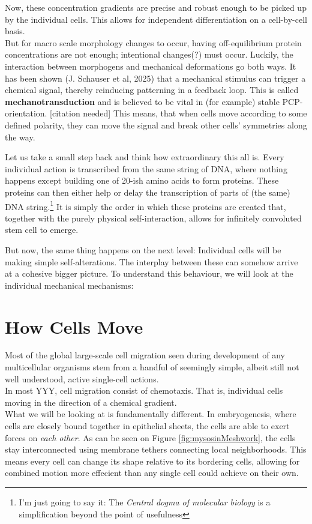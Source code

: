 Now, these concentration gradients are precise and robust enough to be picked up by the individual cells. This allows for independent differentiation on a cell-by-cell basis.\\


But for macro scale morphology changes to occur, having off-equilibrium protein concentrations are not enough; intentional changes(?) must occur. Luckily, the interaction between morphogens and mechanical deformations go both ways. It has been shown (J. Schauser et al, 2025) that a mechanical stimulus can trigger a chemical signal, thereby reinducing patterning in a feedback loop. This is called \textbf{mechanotransduction} and is believed to be vital in (for example) stable PCP-orientation. [citation needed] This means, that when cells move according to some defined polarity, they can move the signal and break other cells' symmetries along the way. \reph 


Let us take a small step back and think how extraordinary this all is. Every individual action is transcribed from the same string of DNA, where nothing happens except building one of 20-ish amino acids to form proteins. These proteins can then either help or delay the transcription of parts of (the same) DNA string.\footnote{I'm just going to say it: The \textit{Central dogma of molecular biology} is a simplification beyond the point of usefulness} It is simply the order in which these proteins are created that, together with the purely physical self-interaction, allows for infinitely convoluted stem cell to emerge.


But now, the same thing happens on the next level: Individual cells will be making simple self-alterations. The interplay between these can somehow arrive at a cohesive bigger picture. To understand this behaviour, we will look at the individual mechanical mechanisms:

\section{How Cells Move}

Most of the global large-scale cell migration seen during development of any multicellular organisms stem from a handful of seemingly simple, albeit still not well understood, active single-cell actions.\cite{walck2014cell}\\

In most YYY, cell migration consist of chemotaxis. That is, individual cells moving in the direction of a chemical gradient.\\
What we will be looking at is fundamentally different. In embryogenesis, where cells are closely bound together in epithelial sheets, the cells are able to exert forces on \textit{each other}. As can be seen on Figure \ref{fig:mysosinMeshwork}, the cells stay interconnected using membrane tethers connecting local neighborhoods. This means every cell can change its shape relative to its bordering cells, allowing for combined motion more effecient than any single cell could achieve on their own. 

